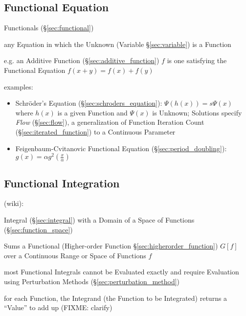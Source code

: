 \subsection{Functional Equation}\label{sec:functional_equation}


Functionals (\S\ref{sec:functional})

any Equation in which the Unknown (Variable \S\ref{sec:variable}) is a Function

e.g. an Additive Function (\S\ref{sec:additive_function}) $f$ is one satisfying
the Functional Equation $f(x + y) = f(x) + f(y)$


examples:
\begin{itemize}
  \item Schr\"oder's Equation (\S\ref{sec:schroders_equation}): $\Psi(h(x)) =
    s\Psi(x)$ where $h(x)$ is a given Function and $\Psi(x)$ is Unknown;
    Solutions specify \emph{Flow} (\S\ref{sec:flow}), a generalization of
    Function Iteration Count (\S\ref{sec:iterated_function}) to a Continuous
    Parameter
  \item Feigenbaum-Cvitanovic Functional Equation (\S\ref{sec:period_doubling}):
    $g(x) = \alpha g^2(\frac{x}{\alpha})$
\end{itemize}



\subsection{Functional Integration}\label{sec:functional_integration}

(wiki):

Integral (\S\ref{sec:integral}) with a Domain of a Space of Functions
(\S\ref{sec:function_space})

Sums a Functional (Higher-order Function \S\ref{sec:higherorder_function})
$G[f]$ over a Continuous Range or Space of Functions $f$

most Functional Integrals cannot be Evaluated exactly and require Evaluation
using Perturbation Methods (\S\ref{sec:perturbation_method})

for each Function, the Integrand (the Function to be Integrated) returns a
``Value'' to add up (FIXME: clarify)

